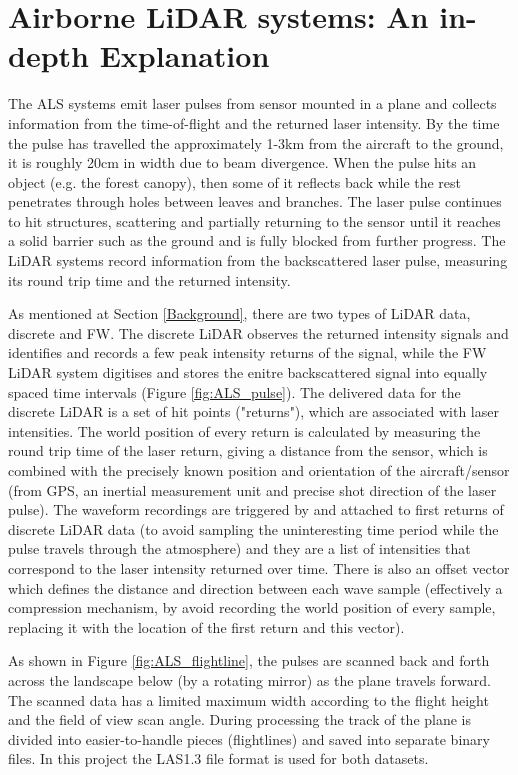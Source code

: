 \documentclass{subfiles}
\begin{document}
    \section{Airborne LiDAR systems: An in-depth Explanation}\label{sec:ALS}
     
        
    
    The ALS systems emit laser pulses from sensor mounted in a plane and collects information from the time-of-flight and the returned laser intensity.  By the time the pulse has travelled the approximately 1-3km from the aircraft to the ground, it is roughly 20cm in width due to beam divergence.  When the pulse hits an object (e.g. the forest canopy), then some of it reflects back while the rest penetrates through holes between leaves and branches. The laser pulse continues to hit structures, scattering and partially returning to the sensor until it reaches a solid barrier such as the ground and is fully blocked from further progress.  The LiDAR systems record information from the backscattered laser pulse, measuring its round trip time and the returned intensity.
     
     As mentioned at Section \ref{Background}, there are two types of LiDAR data,  discrete and FW. The discrete LiDAR observes the returned intensity signals and identifies and {\color{blue} records a few peak intensity returns of the signal}, while the FW LiDAR system digitises and stores the enitre backscattered signal into equally spaced time intervals (Figure \ref{fig:ALS_pulse}). The delivered data for the discrete LiDAR is a set of hit points ("returns"), which are associated with laser intensities. The world position of every return is calculated by measuring the round trip time of the laser return, giving a distance from the sensor, which is combined with the precisely known position and orientation of the aircraft/sensor (from GPS, an inertial measurement unit and precise shot direction of the laser pulse). The waveform recordings are triggered by and attached to first returns of discrete LiDAR data (to avoid sampling the uninteresting time period while the pulse travels through the atmosphere) and they are a list of intensities that correspond to the laser intensity returned over time. There is also an offset vector which defines the distance and direction between each wave sample (effectively a compression mechanism, by avoid recording the world position of every sample, replacing it with the location of the first return and this vector).
     
	As shown in Figure \ref{fig:ALS_flightline}, the pulses are scanned back and forth across the landscape below (by a rotating mirror) as the plane travels forward.  The scanned data has a limited maximum width according to the flight height and the field of view scan angle. During processing the track of the plane is divided into easier-to-handle pieces (flightlines) and saved into separate binary files. In this project the LAS1.3 file format is used for both datasets. 
      
\end{document}
